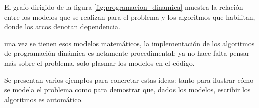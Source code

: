El grafo dirigido de la figura \ref{fig:programacion_dinamica} muestra la relación entre los modelos que se realizan para el problema y los algoritmos que habilitan, donde los arcos denotan dependencia.



una vez se tienen esos modelos matemáticos, la implementación de los algoritmos de programación dinámica es netamente procedimental: ya no hace falta pensar más sobre el problema, solo plasmar los modelos en el código.

Se presentan varios ejemplos para concretar estas ideas: tanto para ilustrar cómo se modela el problema como para demostrar que, dados los modelos, escribir los algoritmos es automático.
